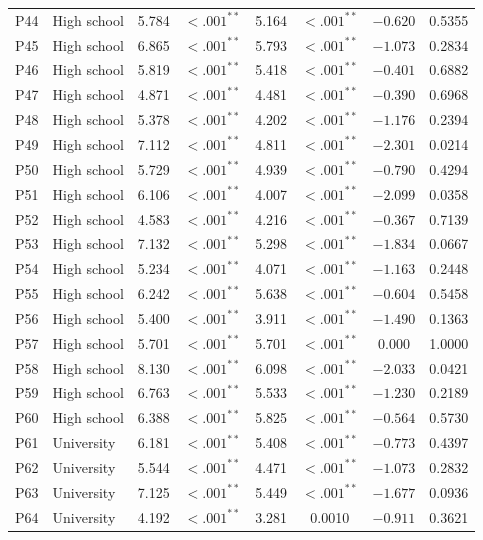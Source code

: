 \begin{longtable}{llcccccc}
P44 & High school & 5.784 & $<.001^{**}$ & 5.164 & $<.001^{**}$ & $-0.620$ & 0.5355 \\
P45 & High school & 6.865 & $<.001^{**}$ & 5.793 & $<.001^{**}$ & $-1.073$ & 0.2834 \\
P46 & High school & 5.819 & $<.001^{**}$ & 5.418 & $<.001^{**}$ & $-0.401$ & 0.6882 \\
P47 & High school & 4.871 & $<.001^{**}$ & 4.481 & $<.001^{**}$ & $-0.390$ & 0.6968 \\
P48 & High school & 5.378 & $<.001^{**}$ & 4.202 & $<.001^{**}$ & $-1.176$ & 0.2394 \\
P49 & High school & 7.112 & $<.001^{**}$ & 4.811 & $<.001^{**}$ & $-2.301$ & 0.0214 \\
P50 & High school & 5.729 & $<.001^{**}$ & 4.939 & $<.001^{**}$ & $-0.790$ & 0.4294 \\
P51 & High school & 6.106 & $<.001^{**}$ & 4.007 & $<.001^{**}$ & $-2.099$ & 0.0358 \\
P52 & High school & 4.583 & $<.001^{**}$ & 4.216 & $<.001^{**}$ & $-0.367$ & 0.7139 \\
P53 & High school & 7.132 & $<.001^{**}$ & 5.298 & $<.001^{**}$ & $-1.834$ & 0.0667 \\
P54 & High school & 5.234 & $<.001^{**}$ & 4.071 & $<.001^{**}$ & $-1.163$ & 0.2448 \\
P55 & High school & 6.242 & $<.001^{**}$ & 5.638 & $<.001^{**}$ & $-0.604$ & 0.5458 \\
P56 & High school & 5.400 & $<.001^{**}$ & 3.911 & $<.001^{**}$ & $-1.490$ & 0.1363 \\
P57 & High school & 5.701 & $<.001^{**}$ & 5.701 & $<.001^{**}$ & 0.000 & 1.0000 \\
P58 & High school & 8.130 & $<.001^{**}$ & 6.098 & $<.001^{**}$ & $-2.033$ & 0.0421 \\
P59 & High school & 6.763 & $<.001^{**}$ & 5.533 & $<.001^{**}$ & $-1.230$ & 0.2189 \\
P60 & High school & 6.388 & $<.001^{**}$ & 5.825 & $<.001^{**}$ & $-0.564$ & 0.5730 \\
\midrule
P61 & University & 6.181 & $<.001^{**}$ & 5.408 & $<.001^{**}$ & $-0.773$ & 0.4397 \\
P62 & University & 5.544 & $<.001^{**}$ & 4.471 & $<.001^{**}$ & $-1.073$ & 0.2832 \\
P63 & University & 7.125 & $<.001^{**}$ & 5.449 & $<.001^{**}$ & $-1.677$ & 0.0936 \\
P64 & University & 4.192 & $<.001^{**}$ & 3.281 & 0.0010 & $-0.911$ & 0.3621 \\

\end{longtable}
